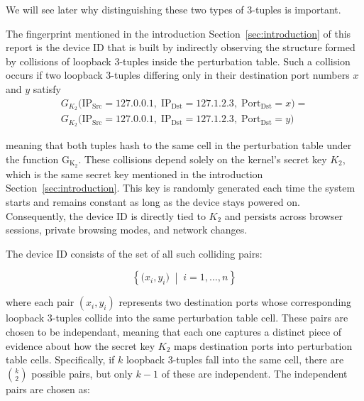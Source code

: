\documentclass[twocolumn]{report}
\begin{document}
We will see later why distinguishing these two types of 3-tuples is important.

The fingerprint mentioned in the introduction Section~\ref{sec:introduction} of this report is the \alert{device ID} that is built by indirectly observing the structure formed by \alert{collisions of loopback 3-tuples} inside the perturbation table. Such a collision occurs if two loopback 3-tuples differing only in their destination port numbers $x$ and $y$ satisfy
\begin{equation*}
	\begin{split}
		G_{K_{2}}\bigl(
		\mathrm{IP}_{\mathrm{Src}} = 127.0.0.1,\;
		\mathrm{IP}_{\mathrm{Dst}} = 127.1.2.3,\;
		\mathrm{Port}_{\mathrm{Dst}} = x
		\bigr)
		= \\
		G_{K_{2}}\bigl(
		\mathrm{IP}_{\mathrm{Src}} = 127.0.0.1,\;
		\mathrm{IP}_{\mathrm{Dst}} = 127.1.2.3,\;
		\mathrm{Port}_{\mathrm{Dst}} = y
		\bigr)
	\end{split}
\end{equation*}
\vspace{-0.5cm}

meaning that both tuples hash to the same cell in the perturbation table under the function $\mathrm{G_{K_2}}$. These collisions depend solely on the kernel’s \alert{secret key} $K_2$, which is the same secret key mentioned in the introduction Section~\ref{sec:introduction}. This key is randomly generated each time the \alert{system starts} and remains constant as long as the device stays powered on. Consequently, the device ID is directly tied to $K_2$ and persists across browser sessions, private browsing modes, and network changes.

The device ID consists of the set of all such colliding pairs:

\vspace{-0.2cm}
\begin{minipage}{\columnwidth}
\[
	\left\{ \bigl(x_i, y_i\bigr) \;\middle|\; i = 1, \ldots, n \right\}
\]
\end{minipage}

where each pair $(x_i, y_i)$ represents \alert{two destination ports} whose corresponding loopback 3-tuples collide into the same perturbation table cell. These pairs are chosen to be \alert{\hypertarget{independant}{independant}}, meaning that each one captures a distinct piece of evidence about how the secret key $K_2$ maps destination ports into perturbation table cells. Specifically, if $k$ loopback 3-tuples fall into the same cell, there are $\binom{k}{2}$ possible pairs, but only $k-1$ of these are independent. The independent pairs are chosen as:
\end{document}
